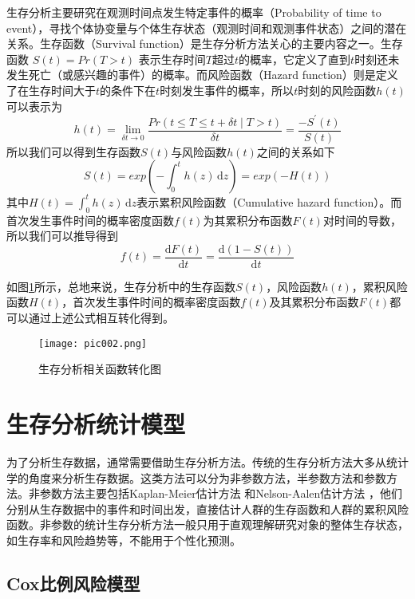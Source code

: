 生存分析主要研究在观测时间点发生特定事件的概率（Probability of time to event），寻找个体协变量与个体生存状态（观测时间和观测事件状态）之间的潜在关系。生存函数（Survival function）是生存分析方法关心的主要内容之一。生存函数 $S(t)=Pr(T>t)$ 表示生存时间$T$超过$t$的概率，它定义了直到$t$时刻还未发生死亡（或感兴趣的事件）的概率。而风险函数（Hazard function）则是定义了在生存时间大于$t$的条件下在$t$时刻发生事件的概率，所以$t$时刻的风险函数$h(t)$可以表示为
\begin{equation}
h(t)=\lim_{\delta t \rightarrow 0} \frac{Pr(t \le T\le t + \delta t \mid T>t)}{\delta t}
    =\frac{-S^{'}(t)}{S(t)} \label{F1}
\end{equation}
所以我们可以得到生存函数$S(t)$与风险函数$h(t)$之间的关系如下
\begin{equation}
S(t)=exp⁡\left(-\int_0^{t} h(z)\,\mathrm{d}z\right)=exp⁡(-H(t)) \label{F2}
\end{equation}
其中$H(t)=\int_0^{t} h(z)\,\mathrm{d}z$表示累积风险函数（Cumulative hazard function）。而首次发生事件时间的概率密度函数$f(t)$为其累积分布函数$F(t)$对时间的导数，所以我们可以推导得到
\begin{equation}
f(t)=\frac{\mathrm{d}F(t)}{\mathrm{d}t}=\frac{\mathrm{d}(1-S(t))}{\mathrm{d}t} \label{F3}
\end{equation}

如图\ref{pic002}所示，总地来说，生存分析中的生存函数$S(t)$，风险函数$h(t)$，累积风险函数$H(t)$，首次发生事件时间的概率密度函数$f(t)$及其累积分布函数$F(t)$都可以通过上述公式相互转化得到。

\begin{figure}[H]
\texttt{[image: pic002.png]}
\caption{生存分析相关函数转化图}
\label{pic002}
\end{figure}

\section{生存分析统计模型}

为了分析生存数据，通常需要借助生存分析方法。传统的生存分析方法大多从统计学的角度来分析生存数据。这类方法可以分为非参数方法，半参数方法和参数方法。非参数方法主要包括Kaplan-Meier估计方法  和Nelson-Aalen估计方法 ，他们分别从生存数据中的事件和时间出发，直接估计人群的生存函数和人群的累积风险函数。非参数的统计生存分析方法一般只用于直观理解研究对象的整体生存状态，如生存率和风险趋势等，不能用于个性化预测。

\subsection{Cox比例风险模型}

